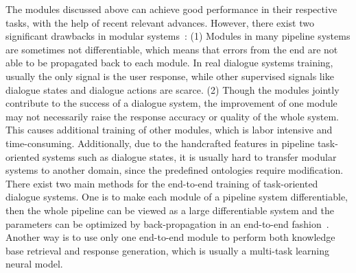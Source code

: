 \label{End-to-end methods}
The modules discussed above can achieve good performance in their respective tasks, with the help of recent relevant advances. However, there exist two significant drawbacks in modular systems~: (1) Modules in many pipeline systems are sometimes not differentiable, which means that errors from the end are not able to be propagated back to each module. In real dialogue systems training, usually the only signal is the user response, while other supervised signals like dialogue states and dialogue actions are scarce. (2) Though the modules jointly contribute to the success of a dialogue system, the improvement of one module may not necessarily raise the response accuracy or quality of the whole system. This causes additional training of other modules, which is labor intensive and time-consuming. Additionally, due to the handcrafted features in pipeline task-oriented systems such as dialogue states, it is usually hard to transfer modular systems to another domain, since the predefined ontologies require modification. 
There exist two main methods for the end-to-end training of task-oriented dialogue systems. One is to make each module of a pipeline system differentiable, then the whole pipeline can be viewed as a large differentiable system and the parameters can be optimized by back-propagation in an end-to-end fashion~. Another way is to use only one end-to-end module to perform both knowledge base retrieval and response generation, which is usually a multi-task learning neural model. 
